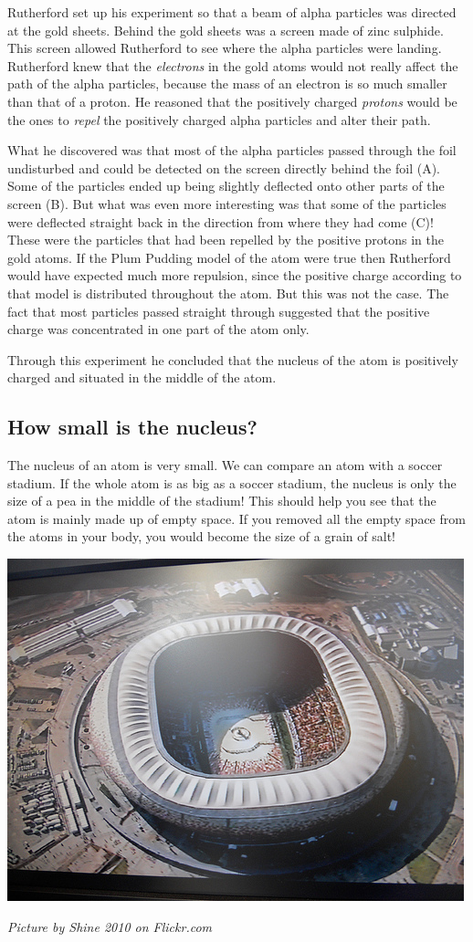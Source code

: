 \label{m38756*id254715}Rutherford set up his experiment so that a beam of alpha particles was directed at the gold sheets. Behind the gold sheets was a screen made of zinc sulphide. This screen allowed Rutherford to see where the alpha particles were landing. Rutherford knew that the \textsl{electrons} in the gold atoms would not really affect the path of the alpha particles, because the mass of an electron is so much smaller than that of a proton. He reasoned that the positively charged \textsl{protons} would be the ones to \textsl{repel} the positively charged alpha particles and alter their path.\par 
\label{m38756*id254738}What he discovered was that most of the alpha particles passed through the foil undisturbed and could be detected on the screen directly behind the foil (A). Some of the particles ended up being slightly deflected onto other parts of the screen (B). But what was even more interesting was that some of the particles were deflected straight back in the direction from where they had come (C)! These were the particles that had been repelled by the positive protons in the gold atoms. If the Plum Pudding model of the atom were true then Rutherford would have expected much more repulsion, since the positive charge according to that model is distributed throughout the atom. But this was not the case. The fact that most particles passed straight through suggested that the positive charge was concentrated in one part of the atom only.\par 
Through this experiment he concluded that the nucleus of the atom is positively charged and situated in the middle of the atom.
\subsection*{How small is the nucleus?}
\begin{minipage}{.5\textwidth}
The nucleus of an atom is very small. We can compare an atom with a soccer stadium. If the whole atom is as big as a soccer stadium, the nucleus is only the size of a pea in the middle of the stadium! This should help you see that the atom is mainly made up of empty space. If you removed all the empty space from the atoms in your body, you would become the size of a grain of salt!
\end{minipage}
\begin{minipage}{.5\textwidth}
\begin{center}
 \includegraphics[width=.4\textwidth]{photos/stadiumby-shine2010-flickr.jpg}\par
\textit{Picture by Shine 2010 on Flickr.com}
\end{center}
\end{minipage}
      \label{m38756*eip-491}
